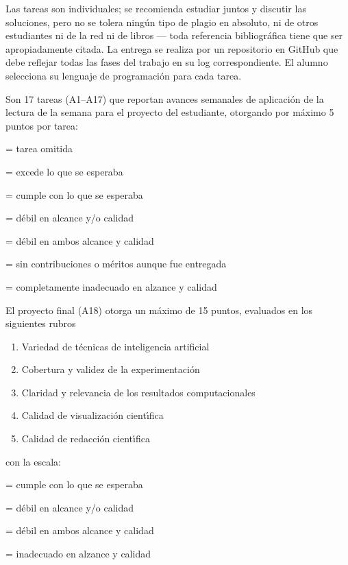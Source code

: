 \documentclass[10 pt]{article}
\begin{document}
  Las tareas son individuales; se recomienda estudiar juntos y
  discutir las soluciones, pero no se tolera ning\'{u}n tipo de plagio en
  absoluto, ni de otros estudiantes ni de la red ni de libros --- toda
  referencia bibliogr\'{a}fica tiene que ser apropiadamente citada. La
  entrega se realiza por un repositorio en GitHub que debe reflejar
  todas las fases del trabajo en su log correspondiente. El alumno
  selecciona su lenguaje de programaci\'{o}n para cada tarea.

  Son 17 tareas (A1--A17) que reportan avances semanales de aplicaci\'{o}n
  de la lectura de la semana para el proyecto del estudiante,
  otorgando por m\'{a}ximo 5 puntos por tarea:
  \begin{description}[itemsep=0em]
  \item[NP]{= tarea omitida}
  \item[5]{= excede lo que se esperaba}
  \item[4]{= cumple con lo que se esperaba}
  \item[3]{= d\'{e}bil en alcance y/o calidad}
  \item[2]{= d\'{e}bil en ambos alcance y calidad}
  \item[1]{= sin contribuciones o m\'{e}ritos aunque fue entregada}
  \item[0]{= completamente inadecuado en alzance y calidad}
  \end{description}
  El proyecto final (A18) otorga un m\'{a}ximo de 15 puntos, evaluados en los
  siguientes rubros
  \begin{enumerate}[itemsep=0em]
  \item{Variedad de t\'{e}cnicas de inteligencia artificial}
  \item{Cobertura y validez de la experimentaci\'{o}n}
  \item{Claridad y relevancia de los resultados computacionales}    
  \item{Calidad de visualizaci\'{o}n cient\'{\i}fica}
  \item{Calidad de redacci\'{o}n cient\'{\i}fica}
  \end{enumerate}
  con la escala:
  \begin{description}[itemsep=0em]
  \item[3]{= cumple con lo que se esperaba}
  \item[2]{= d\'{e}bil en alcance y/o calidad}
  \item[1]{= d\'{e}bil en ambos alcance y calidad}
  \item[0]{= inadecuado en alzance y calidad}
  \end{description}
\end{document}

